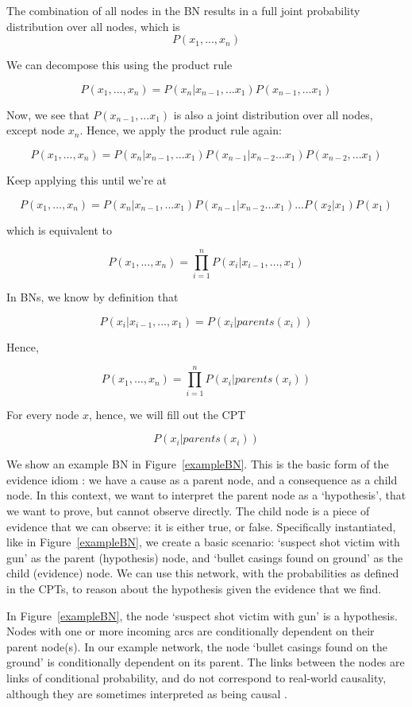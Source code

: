 \documentclass[12pt]{article}
\begin{document}
The combination of all nodes in the BN results in a full joint probability distribution over all nodes, which is 
\[P(x_1, ..., x_n)\]

We can decompose this using the product rule

\[P(x_1, ..., x_n) =  P(x_n|x_{n-1},... x_1) P(x_{n-1},...x_1)\]

Now, we see that $P(x_{n-1},...x_1)$ is also a joint distribution over all nodes, except node $x_n$. Hence, we apply the product rule again:

\[P(x_1, ..., x_n) =  P(x_n|x_{n-1},... x_1) P(x_{n-1}| x_{n-2}...x_1) P(x_{n-2},...x_1)\]

Keep applying this until we're at

\[P(x_1, ..., x_n) =  P(x_n|x_{n-1},... x_1) P(x_{n-1}| x_{n-2}...x_1) ... P(x_2 | x_1)P(x_1)\]

which is equivalent to 

\[P(x_1, ..., x_n) =  \prod_{i=1}^n P(x_i | x_{i-1},..., x_1)\]

In BNs, we know by definition that  

\[ P(x_i | x_{i-1},..., x_1) = P(x_i | parents(x_i))\]

Hence,

\[P(x_1, ..., x_n) =  \prod_{i=1}^n P(x_i | parents(x_i))\]

For every node $x$, hence, we will fill out the CPT

\[P(x_i | parents(x_i))\]




We show an example BN in Figure~\ref{exampleBN}. This is the basic form of the evidence idiom \citep{Fenton2012}: we have a cause as a parent node, and a consequence as a child node. In this context, we want to interpret the parent node as a `hypothesis', that we want to prove, but cannot observe directly. The child node is a piece of evidence that we can observe: it is either true, or false. Specifically instantiated, like in Figure~\ref{exampleBN}, we create a basic scenario: `suspect shot victim with gun' as the parent (hypothesis) node, and `bullet casings found on ground' as the child (evidence) node. We can use this network, with the probabilities as defined in the CPTs, to reason about the hypothesis given the evidence that we find.
 
In Figure~\ref{exampleBN}, the node `suspect shot victim with gun' is a hypothesis. Nodes with one or more incoming arcs are conditionally dependent on their parent node(s). In our example network, the node `bullet casings found on the ground' is conditionally dependent on its parent. The links between the nodes are links of conditional probability, and do not correspond to real-world causality, although they are sometimes interpreted as being causal \citep{Dawid2008}.
\end{document}
